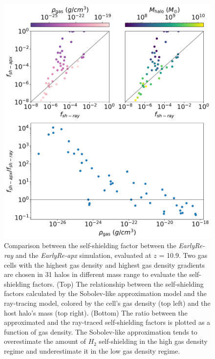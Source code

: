 \documentclass[linenumbers, twocolumn]{aastex631}
\begin{document}
\begin{figure}
	\centering
	\includegraphics[width=0.95\columnwidth]{EarlyRe/fsh_comparison_ver2.png}
	\caption{Comparison between the self-shielding factor between the \textit{EarlyRe-ray} and the \textit{EarlyRe-apx} simulation, evaluated at $z$ = 10.9. Two gas cells with the highest gas density and highest gas density gradients are chosen in 31 halos in different mass range to evaluate the self-shielding factors. (Top) The relationship between the self-shielding factors calculated by the Sobolev-like approximation model and the ray-tracing model, colored by the cell's gas density (top left) and the host halo's mass (top right). (Bottom) The ratio between the approximated and the ray-traced self-shielding factors is plotted as a function of gas density. The Sobolev-like approximation tends to overestimate the amount of $H_{2}$ self-shielding in the high gas density regime and underestimate it in the low gas density regime.}
	\label{fig:fsh_comparison}
\end{figure} 
\end{document}
